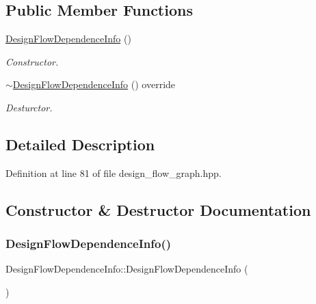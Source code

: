 \subsection*{Public Member Functions}
\begin{DoxyCompactItemize}
\item 
\hyperlink{structDesignFlowDependenceInfo_a444d7e0a77d91ee8acd83fa697a511d0}{Design\+Flow\+Dependence\+Info} ()
\begin{DoxyCompactList}\small\item\em Constructor. \end{DoxyCompactList}\item 
\hyperlink{structDesignFlowDependenceInfo_ab381d8213f756798fb687118a1fb9eb3}{$\sim$\+Design\+Flow\+Dependence\+Info} () override
\begin{DoxyCompactList}\small\item\em Desturctor. \end{DoxyCompactList}\end{DoxyCompactItemize}


\subsection{Detailed Description}


Definition at line 81 of file design\+\_\+flow\+\_\+graph.\+hpp.



\subsection{Constructor \& Destructor Documentation}
\mbox{\label{structDesignFlowDependenceInfo_a444d7e0a77d91ee8acd83fa697a511d0}} 
\subsubsection{\texorpdfstring{Design\+Flow\+Dependence\+Info()}{DesignFlowDependenceInfo()}}
{\footnotesize\ttfamily Design\+Flow\+Dependence\+Info\+::\+Design\+Flow\+Dependence\+Info (\begin{DoxyParamCaption}{ }\end{DoxyParamCaption})\hspace{0.3cm}{\ttfamily [default]}}




